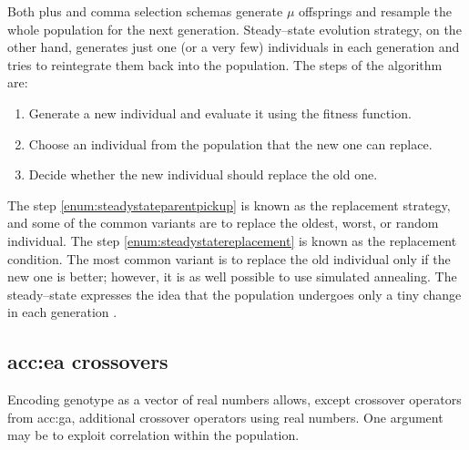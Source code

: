 Both plus and comma selection schemas generate $\mu$ offsprings and resample the whole population for the next generation. Steady--state evolution strategy, on the other hand, generates just one (or a very few) individuals in each generation and tries to reintegrate them back into the population. The steps of the algorithm are:
\begin{enumerate}
    \item Generate a new individual and evaluate it using the fitness function.
    \item\label{enum:steadystateparentpickup} Choose an individual from the population that the new one can replace.
    \item\label{enum:steadystatereplacement} Decide whether the new individual should replace the old one.
\end{enumerate}
The step \ref{enum:steadystateparentpickup} is known as the replacement strategy, and some of the common variants are to replace the oldest, worst, or random individual. The step \ref{enum:steadystatereplacement} is known as the replacement condition. The most common variant is to replace the old individual only if the new one is better; however, it is as well possible to use simulated annealing.
The steady--state expresses the idea that the population undergoes only a tiny change in each generation \citep{SteadyStateEvolutionStrategy}.

\subsection{\texorpdfstring{\acrshort*{acc:ea} crossovers}{Crossovers}}

Encoding genotype as a vector of real numbers allows, except crossover operators from \acrshort{acc:ga}, additional crossover operators using real numbers. One argument may be to exploit correlation within the population.

